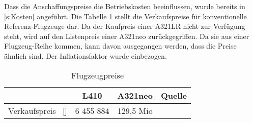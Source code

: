 Dass die Anschaffungspreise die Betriebskosten beeinflussen, 
wurde bereits in \ref{s:Kosten} angeführt. 
Die Tabelle \ref{Flugzeugpreise} stellt die Verkaufspreise 
für konventionelle Referenz-Flugzeuge dar.
Da der Kaufpreis einer A321LR nicht zur Verfügung steht, 
wird auf den Listenpreis einer A321neo zurückgegriffen. 
Da sie aus einer Flugzeug-Reihe kommen, kann davon ausgegangen werden, 
dass die Preise ähnlich sind. Der Inflationsfaktor wurde einbezogen.

\begin{table}[h]
	\begin{center}
    \caption{Flugzeugpreise}
	\label{Flugzeugpreise}
	\begin{tabular}{|l|c|c|c|}
		\hline
		 & \textbf{L410} & \textbf{A321neo}  & \textbf{Quelle}  \\ \hline
		 Verkaufspreis ~[\text{EUR}] & 6 455 884 & 129,5 Mio &  \cite{marksel2023comparative} \cite{aerotelegraph_airbus}\\ \hline
	\end{tabular}
    \end{center}
\end{table}

